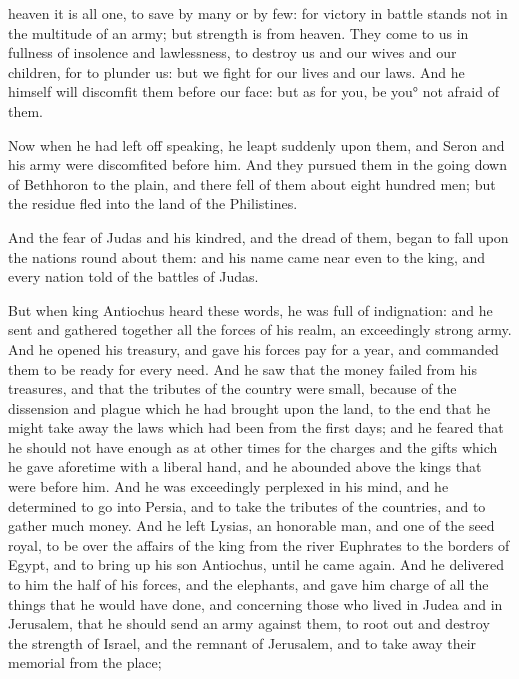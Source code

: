 { heaven it is all one, to save by many or by few:
for victory in battle stands not in the multitude of an army; but strength is from heaven.
They come to us in fullness of insolence and lawlessness, to destroy us and our wives and our children, for to plunder us:
but we fight for our lives and our laws.
And he himself will discomfit them before our face: but as for you, be you° not afraid of them.
\par }{\PP {}Now when he had left off speaking, he leapt suddenly upon them, and Seron and his army were discomfited before him.
And they pursued them in the going down of Bethhoron to the plain, and there fell of them about eight hundred men; but the residue fled into the land of the Philistines.
\par }{\PP {}And the fear of Judas and his kindred, and the dread of them, began to fall upon the nations round about them:
and his name came near even to the king, and every nation told of the battles of Judas.
\par }{\PP {}But when king Antiochus heard these words, he was full of indignation: and he sent and gathered together all the forces of his realm, an exceedingly strong army.
And he opened his treasury, and gave his forces pay for a year, and commanded them to be ready for every need.
And he saw that the money failed from his treasures, and that the tributes of the country were small, because of the dissension and plague which he had brought upon the land, to the end that he might take away the laws which had been from the first days;
and he feared that he should not have enough as at other times for the charges and the gifts which he gave aforetime with a liberal hand, and he abounded above the kings that were before him.
And he was exceedingly perplexed in his mind, and he determined to go into Persia, and to take the tributes of the countries, and to gather much money.
And he left Lysias, an honorable man, and one of the seed royal, to be over the affairs of the king from the river Euphrates to the borders of Egypt,
and to bring up his son Antiochus, until he came again.
And he delivered to him the half of his forces, and the elephants, and gave him charge of all the things that he would have done, and concerning those who lived in Judea and in Jerusalem,
that he should send an army against them, to root out and destroy the strength of Israel, and the remnant of Jerusalem, and to take away their memorial from the place;
}
